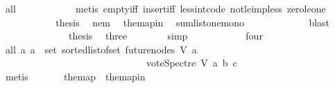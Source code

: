 \begin{isabellebody}
\ all{}{}{\isacharunderscore}{\kern0pt}{}\isanewline
\ \ \ \ \ \ \ \ \ \ \isamarkupfalse%
\ {\isacharparenleft}{\kern0pt}metis\ empty{\isacharunderscore}{\kern0pt}iff\ insert{\isacharunderscore}{\kern0pt}iff\ less{\isacharunderscore}{\kern0pt}int{\isacharunderscore}{\kern0pt}code{\isacharparenleft}{\kern0pt}{}{\isacharparenright}{\kern0pt}\ not{\isacharunderscore}{\kern0pt}le{\isacharunderscore}{\kern0pt}imp{\isacharunderscore}{\kern0pt}less\ zero{\isacharunderscore}{\kern0pt}le{\isacharunderscore}{\kern0pt}one{\isacharparenright}{\kern0pt}\ \isanewline
\ \ \ \ \ \ \ \ \isamarkupfalse%
\ \isamarkupfalse%
\ {\isacharquery}{\kern0pt}thesis\ \isamarkupfalse%
\ nem\ \isamarkupfalse%
\ the{\isacharunderscore}{\kern0pt}map{\isacharunderscore}{\kern0pt}in\ \isamarkupfalse%
\ sumlist{\isacharunderscore}{\kern0pt}one{\isacharunderscore}{\kern0pt}mono\ \isanewline
\ \ \ \ \ \ \ \ \ \ \isamarkupfalse%
\ blast\ \ \isanewline
\ \ \ \ \ \ \isamarkupfalse%
\isanewline
\ \ \ \ \isamarkupfalse%
\ \isamarkupfalse%
\ {\isacharquery}{\kern0pt}thesis\ \isamarkupfalse%
\ three\isanewline
\ \ \ \ \ \ \isamarkupfalse%
\ simp\ \ \isanewline
\ \ \isamarkupfalse%
\isanewline
\ \ \ \ \ \isamarkupfalse%
\ four\ \isanewline
\ \ \ \ \ \isamarkupfalse%
\ \isamarkupfalse%
\ all{}{}{\isacharcolon}{\kern0pt}\ {\isachardoublequoteopen}{\isasymforall}a{}{\isachardot}{\kern0pt}\ a{}\ {\isasymin}\ set\ {\isacharparenleft}{\kern0pt}sorted{\isacharunderscore}{\kern0pt}list{\isacharunderscore}{\kern0pt}of{\isacharunderscore}{\kern0pt}set\ {\isacharparenleft}{\kern0pt}future{\isacharunderscore}{\kern0pt}nodes\ V\ a{\isacharparenright}{\kern0pt}{\isacharparenright}{\kern0pt}\ {\isasymlongrightarrow}\isanewline
\ \ \ \ \ \ \ \ \ \ \ \ \ \ \ \ \ \ \ \ \ \ \ \ \ \ \ \ \ \ vote{\isacharunderscore}{\kern0pt}Spectre\ V\ a{}\ b\ c\ {\isasymin}\ {\isacharbraceleft}{\kern0pt}{}{\isacharcomma}{\kern0pt}{}{\isacharbraceright}{\kern0pt}{\isachardoublequoteclose}\isanewline
\ \ \ \ \ \ \ \isamarkupfalse%
\ {}\isanewline
\ \ \ \ \ \ \ \isamarkupfalse%
\ metis\isanewline
\ \ \ \ \ \isamarkupfalse%
\ the{\isacharunderscore}{\kern0pt}map\ \ the{\isacharunderscore}{\kern0pt}map{\isacharunderscore}{\kern0pt}in{\isacharcolon}{\kern0pt}\ \isanewline

\end{isabellebody}

